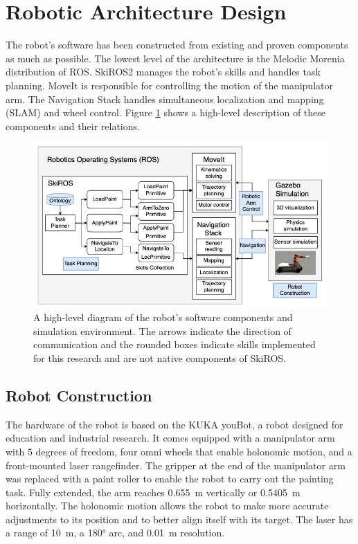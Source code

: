 \section{Robotic Architecture Design} \label{sec:architecture}
The robot's software has been constructed from existing and proven components as much as possible. The lowest level of the architecture is the Melodic Morenia distribution of ROS. SkiROS2 \cite{skiros2} manages the robot's skills and handles task planning. MoveIt \cite{moveit} is responsible for controlling the motion of the manipulator arm. The Navigation Stack \cite{navigation_stack} handles simultaneous localization and mapping (SLAM) and wheel control. Figure \ref{fig:paintbot_arch} shows a high-level description of these components and their relations.

\begin{figure}
    \centering
    \includegraphics[width=1.0\linewidth]{images/architecture.png}
    \caption{A high-level diagram of the robot's software components and simulation environment. The arrows indicate the direction of communication and the rounded boxes indicate skills implemented for this research and are not native components of SkiROS.}
    \label{fig:paintbot_arch}
\end{figure}

\subsection{Robot Construction}
The hardware of the robot is based on the KUKA youBot, a robot designed for education and industrial research. It comes equipped with a manipulator arm with $5$ degrees of freedom, four omni wheels that enable holonomic motion, and a front-mounted laser rangefinder. The gripper at the end of the manipulator arm was replaced with a paint roller to enable the robot to carry out the painting task. Fully extended, the arm reaches \SI{0.655}{\meter} vertically or \SI{0.5405}{\meter} horizontally. The holonomic motion allows the robot to make more accurate adjustments to its position and to better align itself with its target. The laser has a range of \SI{10}{\meter}, a \ang{180} arc, and \SI{0.01}{\meter} resolution.

